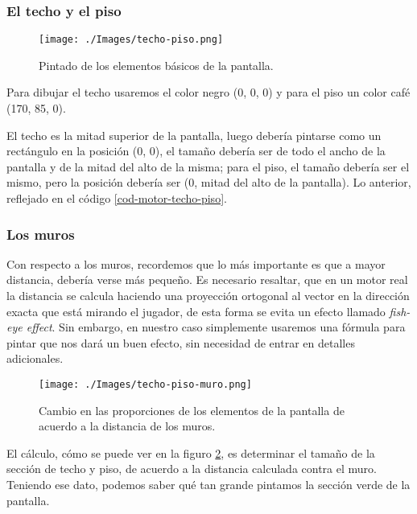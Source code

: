 \subsubsection{El techo y el piso}

\begin{figure}[h!]
	\centering
	\texttt{[image: ./Images/techo-piso.png]}
	\caption{Pintado de los elementos básicos de la pantalla.}
	\label{techo-piso}
\end{figure}

Para dibujar el techo usaremos el color negro (0, 0, 0) y para el piso un color café (170, 85, 0). 

El techo es la mitad superior de la pantalla, luego debería pintarse como un rectángulo en la posición (0, 0), el tamaño debería ser de todo el ancho de la pantalla y de la mitad del alto de la misma; para el piso, el tamaño debería ser el mismo, pero la posición debería ser (0, mitad del alto de la pantalla). Lo anterior, reflejado en el código \ref{cod-motor-techo-piso}.

\newpage



\subsubsection{Los muros}

Con respecto a los muros, recordemos que lo más importante es que a mayor distancia, debería verse más pequeño. Es necesario resaltar, que en un motor real la distancia se calcula haciendo una proyección ortogonal al vector en la dirección exacta que está mirando el jugador, de esta forma se evita un efecto llamado \emph{fish-eye effect}. Sin embargo, en nuestro caso simplemente usaremos una fórmula para pintar que nos dará un buen efecto, sin necesidad de entrar en detalles adicionales.

\begin{figure}[h!]
	\centering
	\texttt{[image: ./Images/techo-piso-muro.png]}
	\caption{Cambio en las proporciones de los elementos de la pantalla de acuerdo a la distancia de los muros.}
	\label{techo-piso-muro}
\end{figure}

El cálculo, cómo se puede ver en la figuro \ref{techo-piso-muro}, es determinar el tamaño de la sección de techo y piso, de acuerdo a la distancia calculada contra el muro. Teniendo ese dato, podemos saber qué tan grande pintamos la sección verde de la pantalla.

